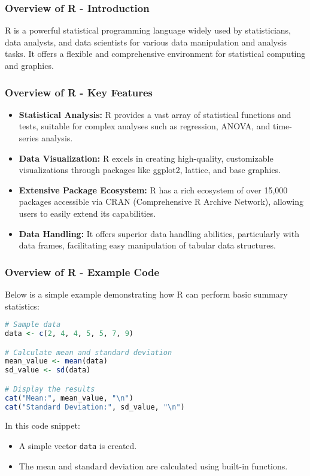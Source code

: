 \documentclass[aspectratio=169]{beamer}
\begin{document}
\begin{frame}[fragile]
    \frametitle{Overview of R - Introduction}
    R is a powerful statistical programming language widely used by statisticians, data analysts, and data scientists for various data manipulation and analysis tasks. 
    It offers a flexible and comprehensive environment for statistical computing and graphics.
\end{frame}

\begin{frame}[fragile]
    \frametitle{Overview of R - Key Features}
    \begin{itemize}
        \item \textbf{Statistical Analysis:} 
        R provides a vast array of statistical functions and tests, suitable for complex analyses such as regression, ANOVA, and time-series analysis.
        
        \item \textbf{Data Visualization:} 
        R excels in creating high-quality, customizable visualizations through packages like ggplot2, lattice, and base graphics.
        
        \item \textbf{Extensive Package Ecosystem:} 
        R has a rich ecosystem of over 15,000 packages accessible via CRAN (Comprehensive R Archive Network), allowing users to easily extend its capabilities.
        
        \item \textbf{Data Handling:} 
        It offers superior data handling abilities, particularly with data frames, facilitating easy manipulation of tabular data structures.
    \end{itemize}
\end{frame}

\begin{frame}[fragile]
    \frametitle{Overview of R - Example Code}
    Below is a simple example demonstrating how R can perform basic summary statistics:

    \begin{lstlisting}[language=R]
# Sample data
data <- c(2, 4, 4, 5, 5, 7, 9)

# Calculate mean and standard deviation
mean_value <- mean(data)
sd_value <- sd(data)

# Display the results
cat("Mean:", mean_value, "\n")
cat("Standard Deviation:", sd_value, "\n")
    \end{lstlisting}

    In this code snippet:
    \begin{itemize}
        \item A simple vector \texttt{data} is created.
        \item The mean and standard deviation are calculated using built-in functions.
    \end{itemize}
\end{frame}
\end{document}
